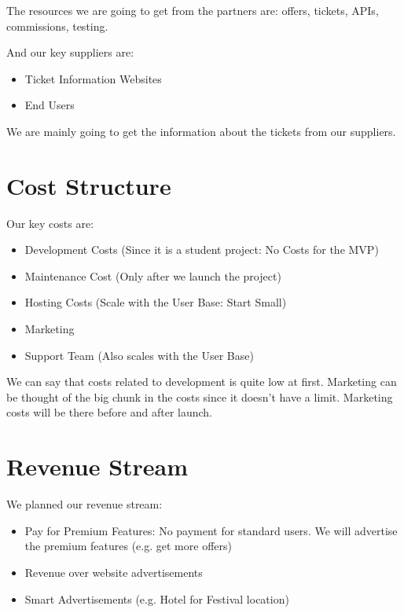 \documentclass{article}
\begin{document}
The resources we are going to get from the partners are: offers, tickets, APIs, commissions, testing.

And our key suppliers are:
\begin{multicols}{2}
    \begin{itemize}
        \item Ticket Information Websites
        \item End Users
    \end{itemize}
\end{multicols}

We are mainly going to get the information about the tickets from our suppliers.

\vspace{-3mm}
\section{Cost Structure}
Our key costs are:
\begin{itemize}
    \item Development Costs (Since it is a student project: No Costs for the MVP)
    \item Maintenance  Cost (Only after we launch the project)
    \item Hosting Costs (Scale with the User Base: Start Small)
    \item Marketing
    \item Support Team (Also scales with the User Base)
\end{itemize}

We can say that costs related to development is quite low at first. Marketing can be thought of the big chunk in the costs since it doesn't have a limit. Marketing costs will be there before and after launch. 

\vspace{-3mm}
\section{Revenue Stream}

We planned our revenue stream:
\begin{itemize}
    \item Pay for Premium Features: No payment for standard users. We will advertise the premium features (e.g. get more offers)
    \item Revenue over website advertisements
    \item Smart Advertisements (e.g. Hotel for Festival location)
\end{itemize}
\end{document}
